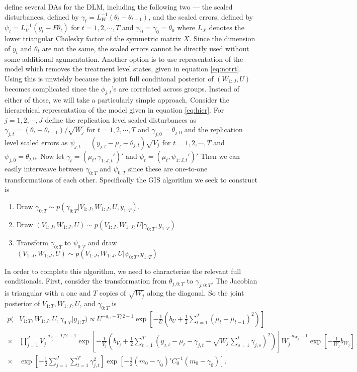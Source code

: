 \documentclass[graybox]{svmult}
\begin{document}
\citet{simpson2014interweaving} define several DAs for the DLM, including the following two --- the scaled disturbances, defined by $\gamma_t = L_W^{-1}(\theta_t - \theta_{t-1})$, and the scaled errors, defined by $\psi_t = L_V^{-1}(y_t - F\theta_t)$ for $t=1,2,\cdots,T$ and $\psi_0=\gamma_0=\theta_0$ where $L_X$ denotes the lower triangular Cholesky factor of the symmetric matrix $X$. Since the dimension of $y_t$ and $\theta_t$ are not the same, the scaled errors cannot be directly used without some additional agumentation. Another option is to use representation of the model which removes the treatment level states, given in equation \ref{eq:notrt}. Using this is unwieldy because the joint full conditional posterior of $(W_{1:J},U)$ becomes complicated since the $\phi_{j,t}$'s are correlated across groups. Instead of either of those, we will take a particularly simple approach. Consider the hierarchical representation of the model given in equation \ref{eq:hier}. For $j=1,2,\cdots,J$ define the replication level scaled disturbances as $\gamma_{j,t}=(\theta_t - \theta_{t-1})/\sqrt{W_j}$ for $t=1,2,\cdots,T$ and $\gamma_{j,0}=\theta_{j,0}$ and the replication level scaled errors as $\psi_{j,t}=(y_{j,t} - \mu_t - \theta_{j,t})\sqrt{V_j}$ for $t=1,2,\cdots,T$ and $\psi_{j,0}=\theta_{j,0}$. Now let $\gamma_t=(\mu_t,\gamma_{1:J,t}')'$ and $\psi_t=(\mu_t,\psi_{1:J,t}')'$ Then we can easily interweave between $\gamma_{0:T}$ and $\psi_{0:T}$ since these are one-to-one transformations of each other. Specifically the GIS algorithm we seek to construct is
\begin{enumerate}
\item Draw $\gamma_{0:T} \sim p(\gamma_{0:T}|V_{1:J},W_{1:J},U,y_{1:T})$.
\item Draw $(V_{1:J},W_{1:J},U) \sim p(V_{1:J},W_{1:J},U|\gamma_{0:T},y_{1:T})$
\item Transform $\gamma_{0:T}$ to $\psi_{0:T}$ and draw $(V_{1:J},W_{1:J},U) \sim p(V_{1:J},W_{1:J},U|\psi_{0:T},y_{1:T})$
\end{enumerate}
In order to complete this algorithm, we need to characterize the relevant full conditionals. First, consider the transformation from $\theta_{j,0:T}$ to $\gamma_{j,0:T}$. The Jacobian is triangular with a one and $T$ copies of $\sqrt{W_j}$ along the diagonal. So the joint posterior of $V_{1:T},W_{1:J},U$, and $\gamma_{0:T}$ is
\begin{align*}
p(&V_{1:T},W_{1:J},U,\gamma_{0:T}|y_{1:T}) \propto U^{-a_U-T/2-1}\exp\left[-\frac{1}{U}\left(b_U + \frac{1}{2}\sum_{t=1}^T(\mu_t - \mu_{t-1})^2\right)\right]\\
\times& \prod_{j=1}^JV_j^{-a_{V_j}-T/2-1}\exp\left[-\frac{1}{V_j}\left(b_{V_j} + \frac{1}{2}\sum_{t=1}^T\left(y_{j,t} - \mu_t - \gamma_{j,t} - \sqrt{W_j}\sum_{s=1}^t\gamma_{j,s}\right)^2\right)\right]W_j^{-a_{W_j}-1}\exp\left[-\frac{1}{W_j}b_{W_j}\right]\\
\times&\exp\left[-\frac{1}{2}\sum_{j=1}^J\sum_{t=1}^T\gamma_{j,t}^2\right]\exp\left[-\frac{1}{2}(m_0 - \gamma_0)'C_0^{-1}(m_0 - \gamma_0)\right].
\end{align*}
\end{document}
